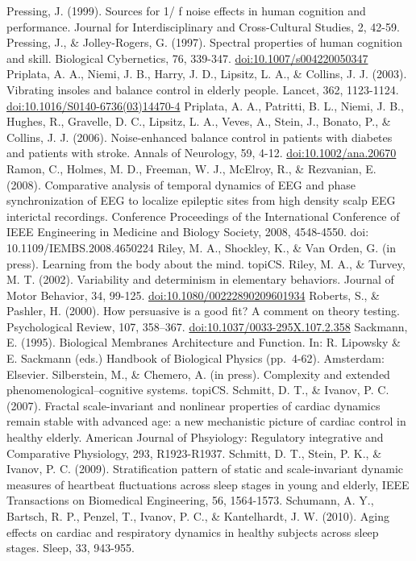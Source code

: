 \documentclass[12pt,]{book}
\begin{document}
Pressing, J. (1999). Sources for 1/ f noise effects in human cognition and performance. Journal for Interdisciplinary and Cross-Cultural Studies, 2, 42-59.
Pressing, J., \& Jolley-Rogers, G. (1997). Spectral properties of human cognition and skill. Biological Cybernetics, 76, 339-347. \url{doi:10.1007/s004220050347}
Priplata, A. A., Niemi, J. B., Harry, J. D., Lipsitz, L. A., \& Collins, J. J. (2003). Vibrating insoles and balance control in elderly people. Lancet, 362, 1123-1124. \url{doi:10.1016/S0140-6736(03)14470-4}
Priplata, A. A., Patritti, B. L., Niemi, J. B., Hughes, R., Gravelle, D. C., Lipsitz, L. A., Veves, A., Stein, J., Bonato, P., \& Collins, J. J. (2006). Noise-enhanced balance control in patients with diabetes and patients with stroke. Annals of Neurology, 59, 4-12. \url{doi:10.1002/ana.20670}
Ramon, C., Holmes, M. D., Freeman, W. J., McElroy, R., \& Rezvanian, E. (2008). Comparative analysis of temporal dynamics of EEG and phase synchronization of EEG to localize epileptic sites from high density scalp EEG interictal recordings. Conference Proceedings of the International Conference of IEEE Engineering in Medicine and Biology Society, 2008, 4548-4550. doi: 10.1109/IEMBS.2008.4650224
Riley, M. A., Shockley, K., \& Van Orden, G. (in press). Learning from the body about the mind. topiCS.
Riley, M. A., \& Turvey, M. T. (2002). Variability and determinism in elementary behaviors. Journal of Motor Behavior, 34, 99-125. \url{doi:10.1080/00222890209601934}
Roberts, S., \& Pashler, H. (2000). How persuasive is a good fit? A comment on theory testing. Psychological Review, 107, 358--367. \url{doi:10.1037/0033-295X.107.2.358}
Sackmann, E. (1995). Biological Membranes Architecture and Function. In: R. Lipowsky \& E. Sackmann (eds.) Handbook of Biological Physics (pp.~4-62). Amsterdam: Elsevier.
Silberstein, M., \& Chemero, A. (in press). Complexity and extended phenomenological--cognitive systems. topiCS.
Schmitt, D. T., \& Ivanov, P. C. (2007). Fractal scale-invariant and nonlinear properties of cardiac dynamics remain stable with advanced age: a new mechanistic picture of cardiac control in healthy elderly. American Journal of Phsyiology: Regulatory integrative and Comparative Physiology, 293, R1923-R1937.
Schmitt, D. T., Stein, P. K., \& Ivanov, P. C. (2009). Stratification pattern of static and scale-invariant dynamic measures of heartbeat fluctuations across sleep stages in young and elderly, IEEE Transactions on Biomedical Engineering, 56, 1564-1573.
Schumann, A. Y., Bartsch, R. P., Penzel, T., Ivanov, P. C., \& Kantelhardt, J. W. (2010). Aging effects on cardiac and respiratory dynamics in healthy subjects across sleep stages. Sleep, 33, 943-955.
\end{document}
